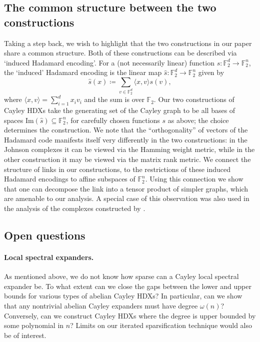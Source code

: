\documentclass[10pt,a4paper]{article}
\theoremstyle{definition}
\theoremstyle{remark}
\newcommand{\Authornotecolored}[3]{{\sffamily\small\color{#1}{[#2: #3]}}}
\newcommand{\Authornotecolored}[3]{}
\newcommand{\Snote}{\Authornotecolored{Green}{S}}
\newcommand{\snote}{\Snote}
\newcommand{\iprod}[1]{\langle#1\rangle}
\newcommand{\F}{\mathbb{F}}
\numberwithin{equation}{section}
\let\origparagraph\paragraph
\renewcommand{\paragraph}[1]{\origparagraph{#1.}}
\newcommand{\Img}{{\textrm {Im}}}
\begin{document}
\subsection{The common structure between the two constructions} \label{sec:intro-common-struct}
Taking a step back, we wish to highlight that the two constructions in our paper share a common structure. Both of these constructions can be described via `induced Hadamard encoding'. For a (not necessarily linear) function \(s:\F_2^d \to \F_2^n\), the `induced' Hadamard encoding is the linear map \(\widehat{s}:\F_2^d \to \F_2^n\) given by
\[\widehat{s}(x) \coloneqq \sum_{v \in \F_2^d} \iprod{x,v} s(v),\]
where \(\iprod{x,v} = \sum_{i=1}^d x_i v_i\) and the sum is over \(\F_2\). Our two constructions of Cayley HDXs take the generating set of the Cayley graph to be all bases of spaces \(\Img(\widehat{s}) \subseteq \F_2^n\), for carefully chosen functions \(s\) as above; the choice determines the construction. We note that the ``orthogonality'' of vectors of the Hadamard code manifests itself very differently in the two constructions: in the Johnson complexes it can be viewed via the Hamming weight metric, while in the other construction it may be viewed via the matrix rank metric. We connect the structure of links in our constructions, to the restrictions of these induced Hadamard encodings to affine subspaces of \(\F_2^n\). Using this connection we show that one can decompose the link into a tensor product of simpler graphs, which are amenable to our analysis. A special case of this observation was also used in the analysis of the complexes constructed by \cite{Golowich2023}.  

\subsection{Open questions} \label{sec:intro-open-questions}
\paragraph{Local spectral expanders} As mentioned above, we do not know how sparse can a Cayley local spectral expander be. To what extent can we close the gaps between the lower and upper bounds for various types of abelian Cayley HDXs? In particular, can we show that any nontrivial abelian Cayley expanders \snote{over $\F_2^n$ or $\F^n$?} must have degree $\omega(n)$? Conversely, can we construct Cayley HDXs where the degree is upper bounded by some polynomial in \(n\)? Limits on our iterated sparsification technique would also be of interest.
\end{document}
